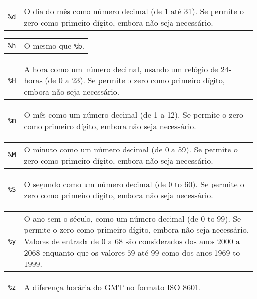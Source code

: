 \documentclass[11pt, brazil]{report}
\begin{document}
\begin{tabular}{@{}p{20pt}p{421.5pt}@{}}
{\tt\%d}&O dia do mês como número decimal (de 1 até 31).
Se permite o zero como primeiro dígito, embora não seja necessário.\\
\end{tabular}

\begin{tabular}{@{}p{20pt}p{421.5pt}@{}}
{\tt\%h}&O mesmo que {\tt\%b}.\\
\end{tabular}

\begin{tabular}{@{}p{20pt}p{421.5pt}@{}}
{\tt\%H}&A hora como um número decimal, usando um relógio de 24-horas (de 0
a 23). Se permite o zero como primeiro dígito, embora não seja necessário.\\
\end{tabular}

\begin{tabular}{@{}p{20pt}p{421.5pt}@{}}
{\tt\%m}&O mês como um número decimal (de 1 a 12).
Se permite o zero como primeiro dígito, embora não seja necessário.\\
\end{tabular}

\begin{tabular}{@{}p{20pt}p{421.5pt}@{}}
{\tt\%M}&O minuto como um número decimal (de 0 a 59).
Se permite o zero como primeiro dígito, embora não seja necessário.\\
\end{tabular}

\begin{tabular}{@{}p{20pt}p{421.5pt}@{}}
{\tt\%S}&O segundo como um número decimal (de 0 to 60).
Se permite o zero como primeiro dígito, embora não seja necessário.\\
\end{tabular}

\begin{tabular}{@{}p{20pt}p{421.5pt}@{}}
{\tt\%y}&O ano sem o século, como um número decimal (de 0 to 99).
Se permite o zero como primeiro dígito, embora não seja necessário.
Valores de entrada de 0 a 68 são considerados dos anos 2000 a 2068
enquanto que os valores 69 até 99 como dos anos 1969 to 1999.\\
\end{tabular}

\begin{tabular}{@{}p{20pt}p{421.5pt}@{}}
{\tt\%z}&A diferença horária do GMT no formato ISO 8601.\\
\end{tabular}
\end{document}
